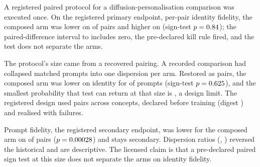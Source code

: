 A registered paired protocol for a diffusion-personalisation comparison was
executed once. On the registered primary endpoint, per-pair identity fidelity,
the composed arm was lower on \RunIdentityLower{} of \RunPairs{} pairs and
higher on \RunIdentityHigher{} (sign-test \(p=0.84{}\)); the
paired-difference interval \RunIdentityCiLo{} to \RunIdentityCiHi{} includes
zero, the pre-declared kill rule fired, and the test does not separate the
arms.

The protocol's size came from a recovered pairing. A recorded comparison had collapsed
\NPairs{} matched prompts into one dispersion per arm. Restored as pairs, the
composed arm was lower on identity for \IdentityDown{} of \NPairs{} prompts
(sign-test \(p=0.625{}\)), and the smallest probability that test can
return at that size is \FloorAtFour{}, a design limit. The registered design
used \DesignTotal{} pairs across \DesignConcepts{} concepts, declared before
training (digest \PredeclarationShaShort{}) and realised with \RunFailures{}
failures.

Prompt fidelity, the registered secondary endpoint, was lower for the composed
arm on \RunPromptLower{} of \RunPairs{} pairs (\(p=0.00028{}\)) and
stays secondary. Dispersion ratios (\RunDispersionDog{},
\RunDispersionClock{}) reversed the historical \SDRatioComposed{} and are
descriptive. The licensed claim is that a pre-declared paired sign test at this
size does not separate the arms on identity fidelity.
